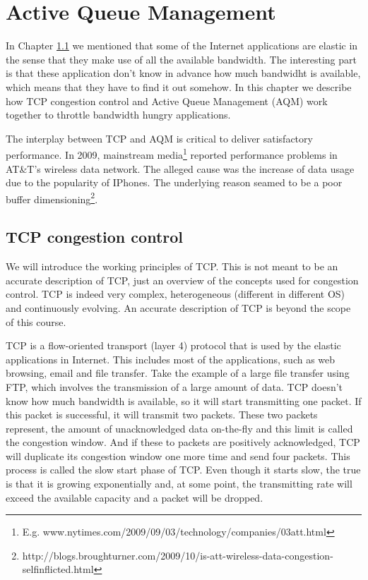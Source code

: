 \chapter{Active Queue Management}

In Chapter \ref{} we mentioned that some of the Internet applications are elastic in the sense that they make use of all the available bandwidth.
The interesting part is that these application don't know in advance how much bandwidht is available, which means that they have to find it out somehow.
In this chapter we describe how TCP congestion control and Active Queue Management (AQM) work together to throttle bandwidth hungry applications.

The interplay between TCP and AQM is critical to deliver satisfactory performance.
In 2009, mainstream media\footnote{E.g. www.nytimes.com/2009/09/03/technology/companies/03att.html} reported performance problems in AT\&T's wireless data network.
The alleged cause was the increase of data usage due to the popularity of IPhones.
The underlying reason seamed to be a poor buffer dimensioning\footnote{http://blogs.broughturner.com/2009/10/is-att-wireless-data-congestion-selfinflicted.html}.

\section{TCP congestion control}
We will introduce the working principles of TCP.
This is not meant to be an accurate description of TCP, just an overview of the concepts used for congestion control.
TCP is indeed very complex, heterogeneous (different in different OS) and continuously evolving.
An accurate description of TCP is beyond the scope of this course.

TCP is a flow-oriented transport (layer 4) protocol that is used by the elastic applications in Internet.
This includes most of the applications, such as web browsing, email and file transfer.
Take the example of a large file transfer using FTP, which involves the transmission of a large amount of data.
TCP doesn't know how much bandwidth is available, so it will start transmitting one packet.
If this packet is successful, it will transmit two packets.
These two packets represent, the amount of unacknowledged data on-the-fly and this limit is called the congestion window.
And if these to packets are positively acknowledged, TCP will duplicate its congestion window one more time and send four packets.
This process is called the slow start phase of TCP.
Even though it starts slow, the true is that it is growing exponentially and, at some point, the transmitting rate will exceed the available capacity and a packet will be dropped.


